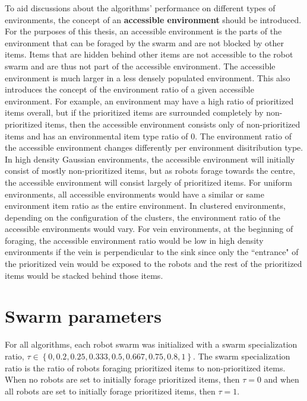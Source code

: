 To aid discussions about the algorithms' performance on different types of environments, the concept of an \textbf{accessible environment} should be introduced. For the purposes of this thesis, an accessible environment is the parts of the environment that can be foraged by the swarm and are not blocked by other items. Items that are hidden behind other items are not accessible to the robot swarm and are thus not part of the accessible environment. The accessible environment is much larger in a less densely populated environment. This also introduces the concept of the environment ratio of a given accessible environment. For example, an environment may have a high ratio of prioritized items overall, but if the prioritized items are surrounded completely by non-prioritized items, then the accessible environment consists only of non-prioritized items and has an environmental item type ratio of 0. The environment ratio of the accessible environment changes differently per environment disitribution type. In high density Gaussian environments, the accessible environment will initially consist of mostly non-prioritized items, but as robots forage towards the centre, the accessible environment will consist largely of prioritized items. For uniform environments, all accessible environments would have a similar or same environment item ratio as the entire environment. In clustered environments, depending on the configuration of the clusters, the environment ratio of the accessible environments would vary. For vein environments, at the beginning of foraging, the accessible environment ratio would be low in high density environments if the vein is perpendicular to the sink since only the ``entrance" of the prioritized vein would be exposed to the robots and the rest of the prioritized items would be stacked behind those items. 

\section{Swarm parameters}
\label{swarmparameters}

For all algorithms, each robot swarm was initialized with a swarm specialization ratio, $\tau\in\left\{0, 0.2, 0.25, 0.333, 0.5, 0.667, 0.75, 0.8,1\right\}$. The swarm specialization ratio is the ratio of robots foraging prioritized items to non-prioritized items. When no robots are set to initially forage prioritized items, then $\tau=0$ and when all robots are set to initially forage prioritized items, then $\tau=1$.

